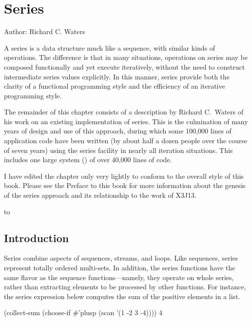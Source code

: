 

\clearpage\def\pagestatus{FINAL PROOF}

\chapter{Series}
\label{SERIES}

\def\SU#1{${}_{#1}$}

\def\fooprime#1{#1'}

Author: Richard C. Waters

\begin{new}
\prefaceword A series is a data structure much like a sequence, with similar
kinds of operations.  The difference is that in many situations, operations
on series may be composed functionally and yet execute iteratively, without
the need to construct intermediate series values explicitly.  In this
manner, series provide both the clarity of a functional programming style
and the efficiency of an iterative programming style.

The remainder of this chapter consists of a description by Richard
C.~Waters of his work on an existing implementation of series.
This is the culmination of many years of design and use of this approach,
during which some 100,000 lines of application code have been written (by
about half a dozen people over the course of seven years) using the series
facility in nearly all iteration situations.  This includes one large
system () of over 40,000 lines of code.

I have edited the chapter only very lightly to conform to the overall style
of this book.  Please see the Preface to this book for more information
about the genesis of the series approach and its relationship to the work
of X3J13.
\end{new}


\noindent\hbox to \textwidth{\hss---Guy L. Steele Jr.}

\section{Introduction}

Series combine aspects of sequences, streams, and loops.  Like sequences,
series represent totally ordered multi-sets.  In addition, the series
functions have the same flavor as the sequence functions---namely, they
operate on whole series, rather than extracting elements to be
processed by other functions.  For instance, the series expression below
computes the sum of the positive elements in a list.
\begin{lisp}
(collect-sum (choose-if \#'plusp (scan '(1 -2 3 -4)))) {\EV} 4
\end{lisp}

